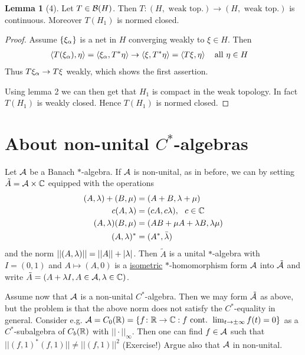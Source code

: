 \documentclass[10pt,english,a4paper]{article}
\theoremstyle{definition}
\newtheorem*{lemma}{Lemma}
\begin{document}
\begin{lemma}[4]
    Let $T \in \mathcal{B}(H)$. Then $T \colon (H ,\text{ weak top.}) \to (H, \text{ weak top.})$
is continuous. Moreover $T(H_1)$ is normed closed.
\end{lemma}
\begin{proof}
    Assume $\{\xi_{\alpha}\}$ is a net in $H$ converging weakly to $\xi \in H$.
    Then
    \begin{align*}
        \left\langle T(\xi_{\alpha}),\eta \right\rangle &= \left\langle \xi_{\alpha}, T^*\eta \right\rangle \to
        \left\langle \xi,T^*\eta \right\rangle= \left\langle T\xi,\eta \right\rangle ~~\text{ all } \eta\in H 
    \end{align*}
    Thus $T\xi_{\alpha} \to T\xi$ weakly, which shows the first assertion.

    Using lemma 2 we can then get that $H_1$ is compact in the weak topology. 
    In fact $T(H_1)$ is weakly closed. Hence $T(H_1)$ is normed closed. 
\end{proof}


\section{About non-unital $C^*$-algebras}
Let $\mathcal{A}$ be a Banach $*$-algebra. If $\mathcal{A}$ is non-unital, as in before, we can 
 by setting $\tilde{A} = \mathcal{A}\times\mathbb{C}$ equipped 
with the operations 
\begin{align*}
    (A,\lambda) + (B,\mu) &= (A+B, \lambda+\mu) \\
    c(A,\lambda) &= (cA,c\lambda), ~~c \in \mathbb{C} \\
    (A,\lambda)(B,\mu) &= (AB + \mu A + \lambda B, \lambda\mu) \\
    (A,\lambda)^* &= (A^*, \bar{\lambda})
\end{align*}
and the norm $||(A,\lambda)|| = ||A|| + |\lambda|$.
Then $\tilde{A}$ is a unital $*$-algebra with $I = (0,1)$ and 
$A\mapsto (A,0)$ is a \ul{isometric} $*$-homomorphism form $\mathcal{A}$ into $\tilde{\mathcal{A}}$ 
and write $\tilde{A} = (A + \lambda I, A \in \mathcal{A}, \lambda \in \mathbb{C})$.

Assume now that $\mathcal{A}$ is a non-unital $C^*$-algebra. Then we may form $\tilde{\mathcal{A}}$
as above, but the problem is that the above norm does not satisfy the $C^*$-equality
in general. Consider e.g. $\mathcal{A} = C_{0}(\mathbb{R}) = \{f \colon \mathbb{R} \to \mathbb{C} : f \text{
cont. } \lim_{t\to\pm\infty}f(t) =0\}$ as a $C^*$-subalgebra of $C_b(\mathbb{R})$ with
$||\cdot||_{\infty}$.
Then one can find $f \in \mathcal{A}$ such that $||(f,1)^*(f,1)|| \neq ||(f,1)||^2$ (Exercise!)
Argue also that $\mathcal{A}$ in non-unital.
\end{document}
